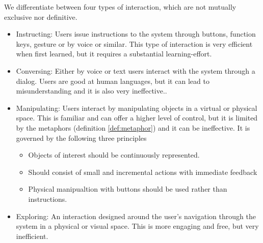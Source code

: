 \begin{definition} \label{def:4_types_of_interaction}  
  We differentiate between four types of interaction, which are not mutually exclusive nor definitive. \cite[p. 47]{rogers}
  \begin{itemize}
    \item Instructing: 
      Users issue instructions to the system through buttons, function keys, gesture or by voice or similar. This type of interaction is very efficient when first learned, but it requires a substantial learning-effort.
      
    \item Conversing: 
      Either by voice or text users interact with the system through a dialog. Users are good at human languages, but it can lead to misunderstanding and it is also very ineffective..
      
    \item Manipulating: 
      Users interact by manipulating objects in a virtual or physical space. This is familiar and can offer a higher level of control, but it is limited by the metaphors (definition \ref{def:metaphor}) and it can be ineffective. It is governed by the following three principles
      \begin{itemize}
        \item Objects of interest should be continuously represented.
        \item Should consist of small and incremental actions with immediate feedback
        \item Physical manipualtion with buttons should be used rather than instructions.
      \end{itemize}
      
    \item Exploring:  
      An interaction designed around the user's navigation through the system in a physical or visual space. This is more engaging and free, but very inefficient.
  \end{itemize}
\end{definition}